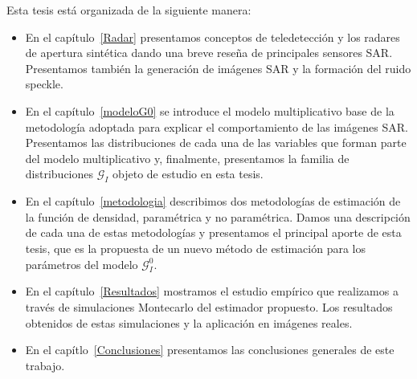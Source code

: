 Esta tesis está organizada de la siguiente manera:
\begin{itemize}
	\item En el capítulo~\ref{Radar} presentamos conceptos de teledetección y los radares de apertura sintética dando una breve reseña de principales sensores SAR. Presentamos también la generación de imágenes SAR y  la formación del ruido speckle.
	\item En el capítulo~\ref{modeloG0} se introduce el modelo multiplicativo base de la metodología adoptada para explicar el comportamiento de las imágenes SAR. Presentamos las distribuciones de cada una de las variables que forman parte del modelo multiplicativo y, finalmente, presentamos la familia de distribuciones $\mathcal{G}_I$ objeto de estudio en esta tesis.
	\item En el capítulo~\ref{metodologia}  describimos dos metodologías de estimación de la función de densidad, paramétrica y no paramétrica. Damos una descripción de cada una de estas metodologías y presentamos el principal aporte de esta tesis, que es la propuesta de un nuevo método de estimación para los parámetros del modelo $\mathcal G_I^0$.
	\item En el capítulo~\ref{Resultados} mostramos el estudio empírico que realizamos a través de simulaciones Montecarlo del estimador propuesto. Los resultados obtenidos de estas simulaciones y la aplicación en imágenes reales.
	\item En el capítlo~\ref{Conclusiones} presentamos las conclusiones generales de este trabajo.
	
\end{itemize}


